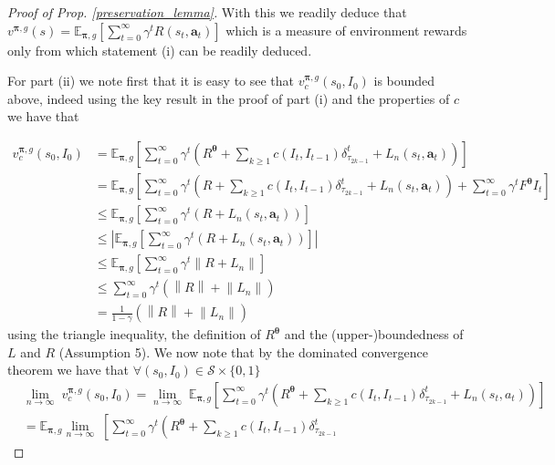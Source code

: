 \documentclass{article}
\begin{document}
\begin{proof}[Proof of Prop. \ref{preservation_lemma}]

With this we readily deduce that $v^{\boldsymbol{\pi},g}(s)=\mathbb{E}_{\boldsymbol{\pi},g}\left[\sum_{t=0}^\infty \gamma^tR(s_t,\boldsymbol{a}_t)\right]$ which is a measure of environment rewards only
from which statement (i) can be readily deduced.

For part (ii) we  note first that it is easy to see that $v^{\boldsymbol{\pi},g}_c(s_0,I_0)$ is bounded above, indeed using the key result in the proof of part (i) and the properties of $c$ we have that

\begin{align}
v^{\boldsymbol{\pi},g}_c(s_0,I_0)&=\mathbb{E}_{\boldsymbol{\pi},g}\left[ \sum_{t=0}^\infty \gamma^t\left(R^{\boldsymbol{\theta}} +\sum_{k\geq 1} c(I_t,I_{t-1})\delta^t_{\tau_{2k-1}}
+L_n(s_t,\boldsymbol{a}_t)\right)\right]
\\&=\mathbb{E}_{\boldsymbol{\pi},g}\left[ \sum_{t=0}^\infty \gamma^t\left(R +\sum_{k\geq 1} c(I_t,I_{t-1})\delta^t_{\tau_{2k-1}}
+L_n(s_t,\boldsymbol{a}_t)\right)+\sum_{t=0}^\infty \gamma^tF^{\boldsymbol{\theta}}I_t\right]
\\&\leq \mathbb{E}_{\boldsymbol{\pi},g}\left[ \sum_{t=0}^\infty \gamma^t\left(R +L_n(s_t,\boldsymbol{a}_t)\right)\right]
\\&\leq \left|\mathbb{E}_{\boldsymbol{\pi},g}\left[ \sum_{t=0}^\infty \gamma^t\left(R+L_n(s_t,\boldsymbol{a}_t)\right)\right]\right|
\\&\leq \mathbb{E}_{\boldsymbol{\pi},g}\left[ \sum_{t=0}^\infty \gamma^t\left\|R +
L_n\right\|\right]
\\&\leq  \sum_{t=0}^\infty \gamma^t\left(\left\|R\right\| +\left\|
L_n\right\|\right)
\\&=\frac{1}{1-\gamma}\left(\left\|R\right\| +\left\|
L_n\right\|\right)
\end{align}
using the triangle inequality, the definition of $R^{\boldsymbol{\theta}}$ and the (upper-)boundedness of $L$ and $R$ (Assumption 5).
We now note that by the dominated convergence theorem we have that $\forall (s_0,I_0)\in\mathcal{S}\times\{0,1\}$
\begin{align}
&\underset{n\to \infty}{\lim}\; v^{\boldsymbol{\pi},g}_c(s_0,I_0)  = \underset{n\to \infty}{\lim}\; \mathbb{E}_{\boldsymbol{\pi},g}\left[ \sum_{t=0}^\infty \gamma^t\left(R^{\boldsymbol{\theta}} +\sum_{k\geq 1} c(I_t,I_{t-1})\delta^t_{\tau_{2k-1}}
+L_n(s_t,{a}_t)\right)\right]
\\&=\mathbb{E}_{\boldsymbol{\pi},g}\underset{n\to \infty}{\lim}\;\left[ \sum_{t=0}^\infty \gamma^t\left(R^{\boldsymbol{\theta}} +\sum_{k\geq 1} c(I_t,I_{t-1})\delta^t_{\tau_{2k-1}}

\end{align}
\end{proof}
\end{document}
